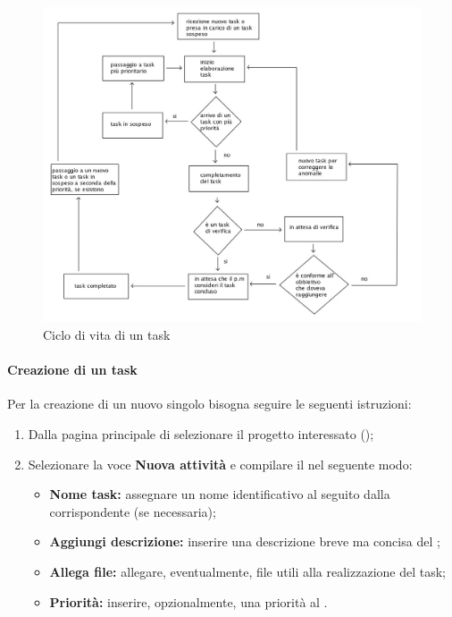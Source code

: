 \begin{figure}[ht]
	\centering
	\includegraphics[scale=0.8]{lavorazione_task.jpg}
	\caption{Ciclo di vita di un task}
\end{figure}



\paragraph{Creazione di un task}
Per la creazione di un nuovo singolo  bisogna seguire le seguenti
istruzioni:
\begin{enumerate}
  \item Dalla pagina principale di  selezionare il progetto interessato (\progetto);
  \item Selezionare la voce \textbf{Nuova attività} e compilare il  nel seguente modo:
    \begin{itemize}
      \item \textbf{Nome task:} assegnare un nome identificativo al  seguito dalla  corrispondente (se necessaria);
      \item \textbf{Aggiungi descrizione:} inserire una descrizione breve ma
      concisa del ;
      \item \textbf{Allega file:} allegare, eventualmente, file utili alla realizzazione del task;
      \item \textbf{Priorità:} inserire, opzionalmente, una priorità al .
    \end{itemize}
\end{enumerate}


